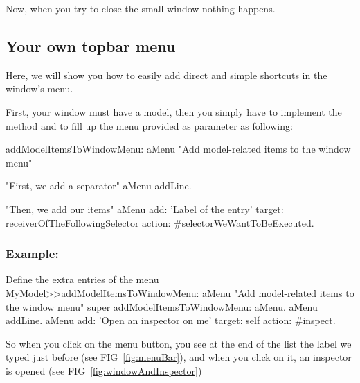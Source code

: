 \documentclass[a4paper,10pt,twoside]{book}
\begin{document}
Now, when you try to close the small window nothing happens.

\subsection{Your own topbar menu}

Here, we will show you how to easily add direct and simple shortcuts in the window's menu.

First, your window must have a model, then you simply have to implement the method  and to fill up the menu provided as parameter as following:

\begin{method}{}
addModelItemsToWindowMenu: aMenu
	"Add model-related items to the window menu"
	
	"First, we add a separator"
	aMenu addLine.
	
	"Then, we add our items"
	aMenu
		add: 'Label of the entry'
		target: receiverOfTheFollowingSelector
		action: #selectorWeWantToBeExecuted.

\end{method} 

\subsubsection{Example:}

\begin{method}{Define the extra entries of the menu}
MyModel>>addModelItemsToWindowMenu: aMenu
	"Add model-related items to the window menu"
	super addModelItemsToWindowMenu: aMenu.
	aMenu addLine.
	aMenu
		add: 'Open an inspector on me'
		target: self
		action: #inspect.
\end{method} 

So when you click on the menu button, you see at the end of the list the label we typed just before (see FIG~\ref{fig:menuBar}), and when you click on it, an inspector is opened (see FIG~\ref{fig:windowAndInspector})
\end{document}
